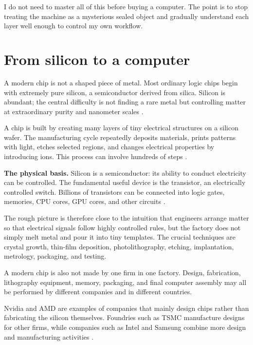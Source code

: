 I do not need to master all of this before
buying a computer.  The point is to stop
treating the machine as a mysterious
sealed object and gradually understand
each layer well enough to control my own
workflow.


\section{From silicon to a computer}

A modern chip is not a shaped piece of
metal. Most ordinary logic chips begin
with extremely pure silicon, a
semiconductor derived from silica.
Silicon is abundant; the central difficulty
is not finding a rare metal but controlling
matter at extraordinary purity and
nanometer scales
\cite{asml-microchip-basics}.

A chip is built by creating many layers of
tiny electrical structures on a silicon
wafer. The manufacturing cycle repeatedly
deposits materials, prints patterns with
light, etches selected regions, and changes
electrical properties by introducing ions.
This process can involve hundreds of steps
\cite{asml-microchips-made}.

\medskip\noindent
{\bf The physical basis.}
Silicon is a semiconductor: its ability to
conduct electricity can be controlled.
The fundamental useful device is the
transistor, an electrically controlled
switch. Billions of transistors can be
connected into logic gates, memories, CPU
cores, GPU cores, and other circuits
\cite{intel-transistor-explained}.

The rough picture is therefore close to
the intuition that engineers arrange matter
so that electrical signals follow highly
controlled rules, but the factory does not
simply melt metal and pour it into tiny
templates. The crucial techniques are
crystal growth, thin-film deposition,
photolithography, etching, implantation,
metrology, packaging, and testing.

A modern chip is also not made by one firm
in one factory. Design, fabrication,
lithography equipment, memory, packaging,
and final computer assembly may all be
performed by different companies and in
different countries.

Nvidia and AMD are examples of companies
that mainly design chips rather than
fabricating the silicon themselves.
Foundries such as TSMC manufacture designs
for other firms, while companies such as
Intel and Samsung combine more design and
manufacturing activities
\cite{asml-microchips-made}.


